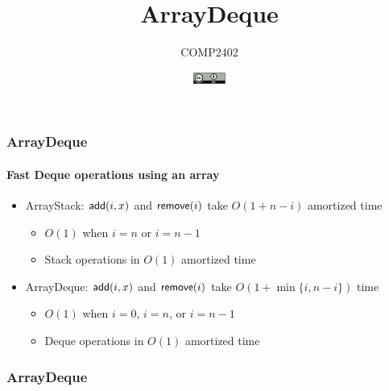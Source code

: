 \documentclass[aspectratio=169,xcolor=dvipsnames]{beamer}
\title{ArrayDeque}
\author{COMP2402}
\date{\includegraphics[height=1em]{by}}
\begin{document}
\begin{frame}
  \titlepage
\end{frame}

\begin{frame}
  \frametitle{ArrayDeque}
  \framesubtitle{Fast Deque operations using an array}

  \begin{itemize}
    \item<+-> ArrayStack: $\mathsf{add}(i,x)$ and $\mathsf{remove}(i)$ take $O(1+n-i)$ amortized time
    \begin{itemize}
      \item<+-> $O(1)$ when $i=n$ or $i=n-1$
      \item<+-> Stack operations in $O(1)$ amortized time
    \end{itemize}
    \item<+-> ArrayDeque: $\mathsf{add}(i,x)$ and $\mathsf{remove}(i)$ take $O(1+\min\{i,n-i\})$ time
    \begin{itemize}
      \item<+-> $O(1)$ when $i=0$, $i=n$, or $i=n-1$
      \item<+-> Deque operations in $O(1)$ amortized time
    \end{itemize}
  \end{itemize}
\end{frame}


\begin{frame}
  \frametitle{ArrayDeque}

  \begin{center}
  \end{center}
\end{frame}
\end{document}
